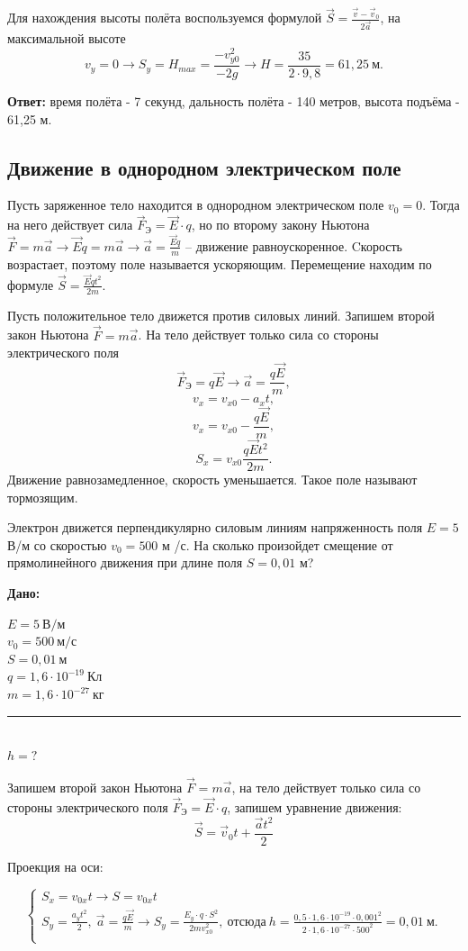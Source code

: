 \documentclass[a5paper, 10pt]{diss_4}
\newcommand{\TNF}{$\vec{F}=m\vec{a}$}
\newcommand{\TNFN}{\vec{F}=m\vec{a}}
\renewcommand{\'}{\,'}
\newcommand{\UDV}{\vec{S}=\vec{v}_0t+\frac{\vec{a}t^2}{2}}
\begin{document}
Для нахождения высоты полёта воспользуемся формулой $\vec{S}=\frac{\vec{v}-\vec{v}_0}{2\vec{a}}$, на максимальной
высоте
\[
v_y=0\to
S_y=H_{max}=\frac{-v^2_{y0}}{-2g}\to H=\frac{35}{2\cdot9,8}=61,25\ м.
\]

\textbf{Ответ:} время полёта - 7 секунд, дальность полёта - 140 метров, высота подъёма - 61,25 м.

\subsection{Движение  в однородном  электрическом  поле}


Пусть заряженное тело находится в однородном электрическом поле $v_0=0$.
Тогда на него действует сила $\vec{F}_Э=\vec{E}\cdot q$, но по второму
закону Ньютона  $\TNFN\to\vec{E}q=m\vec{a}\to\vec{a}=\frac{\vec{E}q}{m}$ -- движение равноускоренное.
Cкорость возрастает, поэтому поле называется  ускоряющим. Перемещение находим по формуле $\vec{S}=\frac{\vec{E}qt^2}{2m}$.

Пусть положительное тело движется против силовых линий. Запишем второй закон Ньютона \TNF.
На тело действует только сила со стороны электрического поля
\[
\vec{F}_Э=q\vec{E}\to
\vec{a}=\frac{q\vec{E}}{m},
\]
\[
v_x=v_{x0}-a_xt,
\]
\[
v_x=v_{x0}-\frac{q\vec{E}}{m},
\]
\[
S_x=v_{x0}\frac{q\vec{E}t^2}{2m}.
\]
Движение равнозамедленное,  скорость уменьшается. Такое поле называют тормозящим.

Электрон движется перпендикулярно силовым линиям напряженность  поля $E =  5$  В/м со скоростью $v_0= 500$ м /с.
На  сколько  произойдет  смещение  от прямолинейного движения при длине поля $S= 0,01$ м?

\hspace{1cm}\textbf{Дано:}\hspace{.3cm}
\parbox[t]{4cm}{
$E = 5\ В/м$\\
$v_0 = 500\ м/с$\\
$S = 0,01\ м$\\
$q = 1,6\cdot10^{-19}\ Кл$\\
$m = 1,6\cdot10^{-27}\ кг$\\
\rule{4cm}{.4pt}\\
$h = ?$\\
}

Запишем второй закон Ньютона \TNF, на тело действует только сила со стороны электрического поля
$\vec{F}_Э=\vec{E}\cdot q$, запишем уравнение движения:
\[
\UDV
\]

Проекция на оси:

\begin{equation*}
     \left\{
          \begin{array}{lr}
 S_x=v_{0x}t\to S=v_{0x}t\\
 S_y=\frac{a_{y}t^2}{2},\ \vec{a}=\frac{q\vec{E}}{m}\to
 S_y=\frac{E_y\cdot q\cdot S^2}{2mv^2_{x0}},\ отсюда\
 h=\frac{0,5\cdot1,6\cdot10^{-19}\cdot0,001^2}{2\cdot1,6\cdot10^{-27}\cdot500^2}=0,01\ м.\\
          \end{array}
     \right.
\end{equation*}
\end{document}
